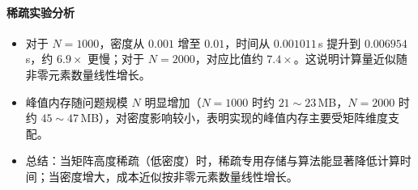 \documentclass{SYSUReport}
\begin{document}
\newpage
\paragraph{稀疏实验分析}
\begin{itemize}
    \item 对于 $N=1000$，密度从 $0.001$ 增至 $0.01$，时间从 $0.001011\,$s 提升到 $0.006954\,$s，约 $6.9\times$ 更慢；对于 $N=2000$，对应比值约 $7.4\times$。这说明计算量近似随非零元素数量线性增长。
    \item 峰值内存随问题规模 $N$ 明显增加（$N=1000$ 时约 $21\sim23\,$MB，$N=2000$ 时约 $45\sim47\,$MB），对密度影响较小，表明实现的峰值内存主要受矩阵维度支配。
    \item 总结：当矩阵高度稀疏（低密度）时，稀疏专用存储与算法能显著降低计算时间；当密度增大，成本近似按非零元素数量线性增长。
\end{itemize}
\end{document}
